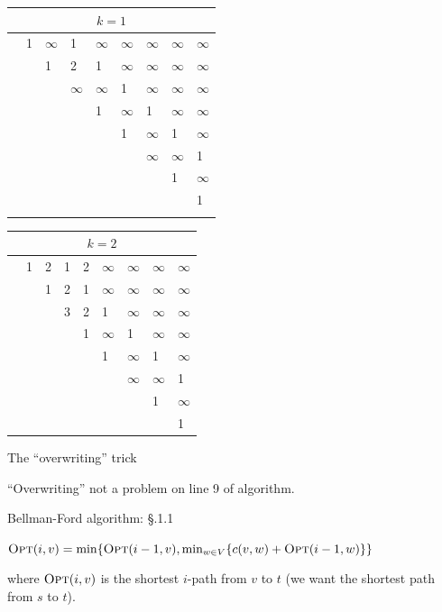 \begin{frame}
\begin{tabular}%
{|p{5mm}|p{5mm}|p{5mm}|p{5mm}|p{5mm}|p{5mm}|p{5mm}|p{5mm}|p{5mm}|}\hline
\multicolumn{9}{|c|}{$k=1$} \\\hline\hline
&1&$\infty$&1&$\infty$&$\infty$&$\infty$&$\infty$&$\infty$ \\\hline
&&1&2&1&$\infty$&$\infty$&$\infty$&$\infty$  \\\hline
&&&$\infty$&$\infty$&1&$\infty$&$\infty$&$\infty$ \\\hline
&&&&1&$\infty$&1&$\infty$&$\infty$ \\\hline
&&&&&1&$\infty$&1&$\infty$ \\\hline
&&&&&&$\infty$&$\infty$&1 \\\hline
&&&&&&&1&$\infty$ \\\hline
&&&&&&&&1 \\\hline
&&&&&&&& \\\hline
\end{tabular}
\end{frame}

\begin{frame}
\begin{tabular}%
{|p{5mm}|p{5mm}|p{5mm}|p{5mm}|p{5mm}|p{5mm}|p{5mm}|p{5mm}|p{5mm}|}\hline
\multicolumn{9}{|c|}{$k=2$} \\\hline\hline
&1&2&1&2&$\infty$&$\infty$&$\infty$&$\infty$ \\\hline
&&1&2&1&$\infty$&$\infty$&$\infty$&$\infty$  \\\hline
&&&3&2&1&$\infty$&$\infty$&$\infty$ \\\hline
&&&&1&$\infty$&1&$\infty$&$\infty$ \\\hline
&&&&&1&$\infty$&1&$\infty$ \\\hline
&&&&&&$\infty$&$\infty$&1 \\\hline
&&&&&&&1&$\infty$ \\\hline
&&&&&&&&1 \\\hline
\end{tabular}
\end{frame}

\begin{frame}
{The ``overwriting'' trick}

``Overwriting'' not a problem on line 9 of algorithm.

\end{frame}

\begin{frame}
{Bellman-Ford algorithm: \S{}.1.1\fi}

$\text{\sc Opt}(i,v)=\min\{\text{\sc Opt}(i-1,v),\min_{w\in V}\{c(v,w)+\text{\sc Opt}(i-1,w)\}\}$

where $\text{\sc Opt}(i,v)$ is the shortest $i$-path from $v$ to $t$ (we want
the shortest path from $s$ to $t$).
\end{frame}

